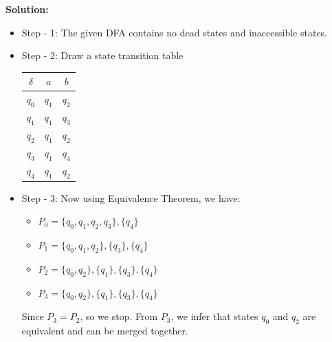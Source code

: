 \begin{examplebreak}{}
  \textbf{Solution:}

  \begin{itemize}
    \item Step - 1:
      The given DFA contains no dead states and inaccessible states.

    \item Step - 2:
      Draw a state transition table
        \begin{center}
          \begin{tabular}{c|c|c}
          $\delta$  & $a$    & $b$     \\ 
          \hline
          $q_0$  & $q_1$  & $q_2$  \\
          $q_1$  & $q_1$  & $q_3$  \\
          $q_2$  & $q_1$  & $q_2$  \\
          $q_3$  & $q_1$  & $q_4$  \\
          $q_4$  & $q_1$  & $q_2$ 
          \end{tabular}
        \end{center}
    
    \item Step - 3:
      Now using Equivalence Theorem, we have:
      \begin{itemize}
        \item $P_0 = \{ q_0 , q_1 , q_2 , q_3 \}, \{ q_4 \}$
        \item $P_1 = \{ q_0 , q_1 , q_2 \}, \{ q_3 \}, \{ q_4 \}$
        \item $P_2 = \{ q_0 , q_2 \}, \{ q_1 \}, \{ q_3 \}, \{ q_4 \}$
        \item $P_3 = \{ q_0 , q_2 \}, \{ q_1 \}, \{ q_3 \}, \{ q_4 \}$
      \end{itemize}

      Since $P_3 = P_2$, so we stop. From $P_3$, we infer that states $q_0$ and $q_2$ are equivalent and can be merged together.
    

\end{itemize}
\end{examplebreak}
